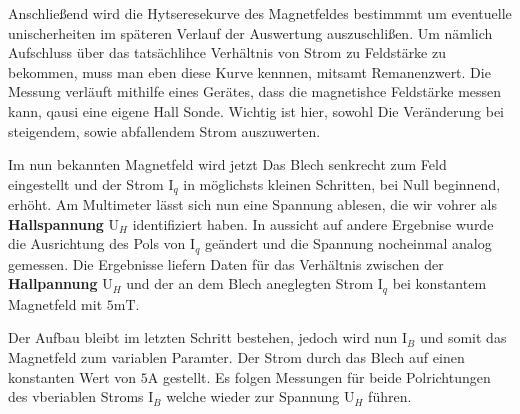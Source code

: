 Anschließend wird die Hytseresekurve %
des Magnetfeldes bestimmmt um eventuelle unischerheiten im späteren Verlauf der Auswertung auszuschlißen. Um nämlich Aufschluss über das 
tatsächlihce Verhältnis von Strom zu Feldstärke zu bekommen, muss man eben diese Kurve kennnen, mitsamt  Remanenzwert. %
Die Messung verläuft mithilfe eines Gerätes, dass die magnetishce Feldstärke messen kann, qausi eine eigene Hall Sonde.   
Wichtig ist hier, sowohl Die Veränderung bei steigendem, sowie abfallendem Strom auszuwerten.  \\ \flushleft

Im nun bekannten Magnetfeld wird jetzt Das Blech senkrecht zum Feld eingestellt und der Strom $\text{I}_q$ in möglichsts kleinen Schritten, bei Null beginnend, erhöht. 
Am Multimeter lässt sich nun eine Spannung ablesen, die wir vohrer als \textbf{Hallspannung} $\text{U}_H$  identifiziert haben. In aussicht auf andere Ergebnise 
wurde die Ausrichtung des Pols von $\text{I}_q$ geändert und die Spannung nocheinmal analog gemessen. Die Ergebnisse liefern Daten für das Verhältnis zwischen 
der \textbf{Hallpannung} $\text{U}_H$ und der an dem Blech aneglegten Strom $\text{I}_q$ bei konstantem Magnetfeld mit $5$m$\si{\tesla}$.\\ \flushleft

Der Aufbau bleibt im letzten Schritt bestehen, jedoch wird nun $\text{I}_B$ und somit das Magnetfeld zum variablen Paramter. Der Strom durch das Blech auf einen 
konstanten Wert von $5\si{\ampere}$ gestellt. Es folgen Messungen für beide Polrichtungen des vberiablen Stroms $\text{I}_B$ welche wieder zur Spannung $\text{U}_H$ führen.
                                                                                                                    
                                                      